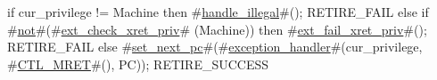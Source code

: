 if   cur_privilege != Machine
then { #\hyperref[sailRISCVzhandlezyillegal]{handle\_illegal}#(); RETIRE_FAIL }
else if #\hyperref[sailRISCVznot]{not}#(#\hyperref[sailRISCVzextzycheckzyxretzypriv]{ext\_check\_xret\_priv}# (Machine))
then { #\hyperref[sailRISCVzextzyfailzyxretzypriv]{ext\_fail\_xret\_priv}#(); RETIRE_FAIL }
else {
  #\hyperref[sailRISCVzsetzynextzypc]{set\_next\_pc}#(#\hyperref[sailRISCVzexceptionzyhandler]{exception\_handler}#(cur_privilege, #\hyperref[sailRISCVzCTLzyMRET]{CTL\_MRET}#(), PC));
  RETIRE_SUCCESS
}
